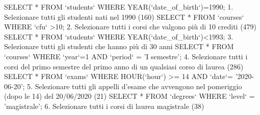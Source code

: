 SELECT * FROM `students` WHERE YEAR(`date_of_birth`)=1990; 1. Selezionare tutti gli studenti nati nel 1990 (160)
SELECT * FROM `courses` WHERE `cfu` >10;  2. Selezionare tutti i corsi che valgono più di 10 crediti (479)
SELECT * FROM `students` WHERE YEAR(`date_of_birth`)<1993; 3. Selezionare tutti gli studenti che hanno più di 30 anni 
SELECT * FROM `courses` WHERE `year`=1 AND `period` = 'I semestre'; 4. Selezionare tutti i corsi del primo semestre del primo anno di un qualsiasi corso di
laurea (286)
SELECT * FROM `exams` WHERE HOUR(`hour`) >= 14 AND `date`= '2020-06-20'; 5. Selezionare tutti gli appelli d'esame che avvengono nel pomeriggio (dopo le 14) del
20/06/2020 (21)
SELECT * FROM `degrees` WHERE `level` = 'magistrale'; 6. Selezionare tutti i corsi di laurea magistrale (38)